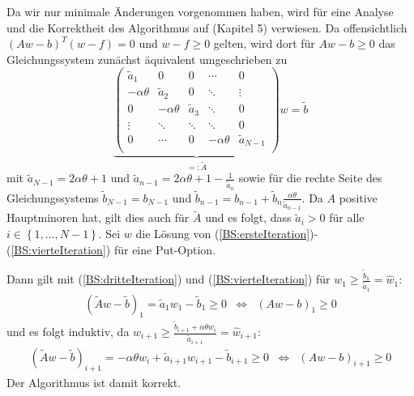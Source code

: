 Da wir nur minimale Änderungen vorgenommen haben, wird für eine Analyse und die Korrektheit des Algorithmus auf \cite{Jaillet} (Kapitel 5) verwiesen. Da offensichtlich $\left(Aw-b\right)^T\left(w-f\right) = 0$ und $w-f\geq 0$ gelten, wird dort für $Aw-b\geq 0$ das Gleichungssystem zunächst äquivalent umgeschrieben zu
\begin{equation}
\underbrace{\begin{pmatrix}
 \tilde a_1  & 0          &  0    & \cdots & 0      \\
 -\alpha\theta  & \tilde a_2 & 0      &   \ddots    & \vdots \\
 0         & -\alpha\theta   & \tilde a_3 & \ddots &    0    \\
 \vdots    & \ddots     & \ddots & \ddots & 0      \\
 0         & \cdots     & 0      & -\alpha\theta & \tilde a_{N-1} \\
 \end{pmatrix}}_{=: \tilde A}w = \tilde b
\end{equation}
mit $\tilde a_{N-1} = 2\alpha\theta +1$ und $\tilde a_{n-1} = 2\alpha\theta +1 - \frac{1}{\tilde a_n}$ sowie für die rechte Seite des Gleichungssystems $\tilde b_{N-1} = b_{N-1}$ und $\tilde b_{n-1} = b_{n-1} + \tilde b_n\frac{\alpha\theta}{\tilde a_{n-1}}$. Da $A$ positive Hauptminoren hat, gilt dies auch für $\tilde A$ und es folgt, dass $\tilde a_i > 0$ für alle $i \in \left\{1,...,N-1\right\}$. Sei $w$ die Lösung von (\ref{BS:ersteIteration})-(\ref{BS:vierteIteration}) für eine Put-Option. 

Dann gilt mit (\ref{BS:dritteIteration}) und (\ref{BS:vierteIteration}) für $w_1 \geq \frac{\tilde b_1}{\tilde a_1} = \hat w_1$:
\begin{eqnarray*}
(\tilde A w -\tilde b)_1 = \tilde a_1w_1-\tilde b_1 \geq 0 & \Leftrightarrow & (Aw-b)_1 \geq 0
\end{eqnarray*}
und es folgt induktiv, da $w_{i+1} \geq \frac{\tilde b_{i+1} + \alpha\theta w_i}{\tilde a_{i+1}} = \hat w_{i+1}$:
\begin{eqnarray*}
(\tilde A w -\tilde b)_{i+1} = -\alpha\theta w_{i} + \tilde a_{i+1}w_{i+1} - \tilde b_{i+1} \geq 0 & \Leftrightarrow & (Aw-b)_{i+1} \geq 0
\end{eqnarray*}
Der Algorithmus ist damit korrekt.  





